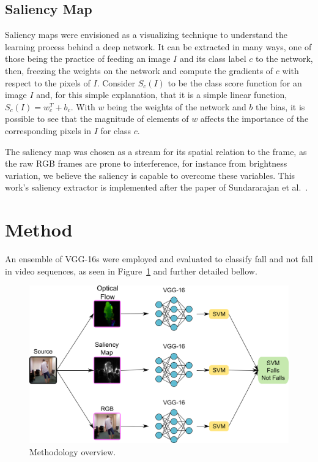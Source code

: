 \documentclass[conference]{IEEEtran}
\begin{document}
\subsection{Saliency Map}
\label{sec:saliency}

Saliency maps were envisioned as a visualizing technique to understand the learning process behind a deep network. It can be extracted in many ways, one of those being the practice of feeding an image $I$ and its class label $c$ to the network, then, freezing the weights on the network and compute the gradients of $c$ with respect to the pixels of $I$. Consider $S_c(I)$ to be the class score function for an image $I$ and, for this simple explanation, that it is a simple linear function, $S_c(I) = w_c^{T} + b_c$. With $w$ being the weights of the network and $b$ the bias, it is possible to see that the magnitude of elements of $w$ affects the importance of the corresponding pixels in $I$ for class $c$.

The saliency map was chosen as a stream for its spatial relation to the frame, as the raw RGB frames are prone to interference, for instance from brightness variation, we believe the saliency is capable to overcome these variables. This work's saliency extractor is implemented after the paper of Sundararajan et al.~\cite{sundararajan2017axiomatic}.

\section{Method}
\label{sec:method}

An ensemble of VGG-16s were employed and evaluated to classify fall and not fall in video sequences, as seen in Figure~\ref{fig:overview} and further detailed bellow.

\begin{figure}[htbp]
\centerline{\includegraphics[width=\linewidth]{figures/overview.png}}
\caption{Methodology overview.}
\label{fig:overview}
\end{figure}
\end{document}
